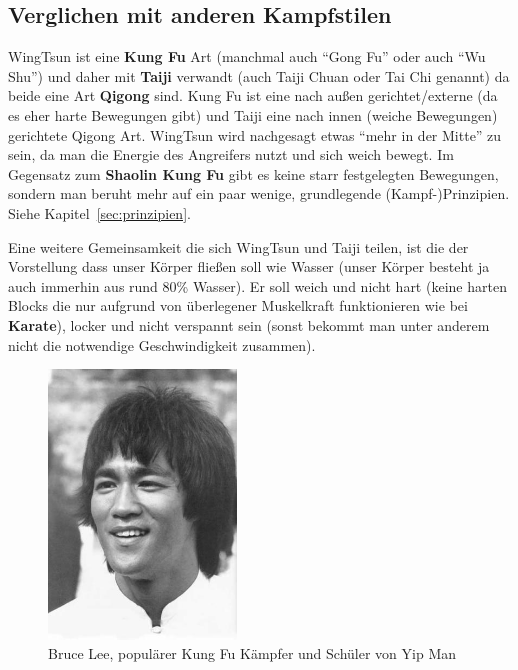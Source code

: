 \documentclass[a4paper,12pt]{scrartcl}
\begin{document}
\subsection{Verglichen mit anderen Kampfstilen}

WingTsun ist eine \textbf{Kung Fu} Art (manchmal auch ``Gong Fu'' oder auch ``Wu Shu'') und daher mit \textbf{Taiji} verwandt (auch Taiji Chuan oder Tai Chi genannt) da beide eine Art \textbf{Qigong} sind. Kung Fu ist eine nach au{\ss}en gerichtet/externe (da es eher harte Bewegungen gibt) und Taiji eine nach innen (weiche Bewegungen) gerichtete Qigong Art. WingTsun wird nachgesagt etwas ``mehr in der Mitte'' zu sein, da man die Energie des Angreifers nutzt und sich weich bewegt. Im Gegensatz zum \textbf{Shaolin Kung Fu} gibt es keine starr festgelegten Bewegungen, sondern man beruht mehr auf ein paar wenige, grundlegende (Kampf-)Prinzipien. Siehe Kapitel~\ref{sec:prinzipien}.

Eine weitere Gemeinsamkeit die sich WingTsun und Taiji teilen, ist die der Vorstellung dass unser K\"orper flie{\ss}en soll wie Wasser (unser K\"orper besteht ja auch immerhin aus rund 80\% Wasser). Er soll weich und nicht hart (keine harten Blocks die nur aufgrund von \"uberlegener Muskelkraft funktionieren wie bei \textbf{Karate}), locker und nicht verspannt sein (sonst bekommt man unter anderem nicht die notwendige Geschwindigkeit zusammen).

\begin{figure}[htbp]
	\centering
	\includegraphics[width=5cm]{image/bruce_lee}
	\caption{Bruce Lee, popul\"arer Kung Fu K\"ampfer und Sch\"uler von Yip Man}
	\label{img:bruce_lee}
\end{figure}

\end{document}
